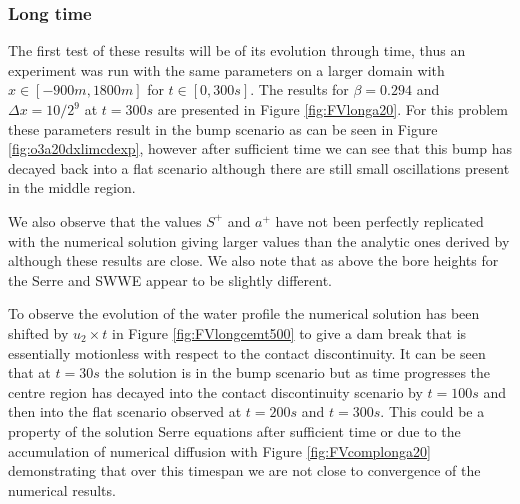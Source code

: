 \documentclass[SingleSpace,12pt,Journal]{Serre_ASCE}
\begin{document}
\subsubsection{Long time}\label{subsubsec:LT}
The first test of these results will be of its evolution through time, thus an experiment was run with the same parameters on a larger domain with $x \in [-900m, 1800m]$ for $t \in [0,300s]$. The results for $\beta = 0.294$ and $\Delta x = 10/2^{9}$ at $t = 300s$ are presented in Figure \ref{fig:FVlonga20}. For this problem these parameters result in the bump scenario as can be seen in Figure \ref{fig:o3a20dxlimcdexp}, however after sufficient time we can see that this bump has decayed back into a flat scenario although there are still small oscillations present in the middle region. 

We also observe that the values $S^+$ and $a^+$ have not been perfectly replicated with the numerical solution giving larger values than the analytic ones derived by  although these results are close. We also note that as above the bore heights for the Serre and SWWE appear to be slightly different.

To observe the evolution of the water profile the numerical solution has been shifted by $u_2  \times t$ in Figure \ref{fig:FVlongcemt500} to give a dam break that is essentially motionless with respect to the contact discontinuity. It can be seen that at $t =30s$ the solution is in the bump scenario but as time progresses the centre region has decayed into the contact discontinuity scenario by $t=100s$ and then into the flat scenario observed at $t=200s$ and $t=300s$. This could be a property of the solution Serre equations after sufficient time or due to the accumulation of numerical diffusion with Figure \ref{fig:FVcomplonga20} demonstrating that over this timespan we are not close to convergence of the numerical results.    
\end{document}
